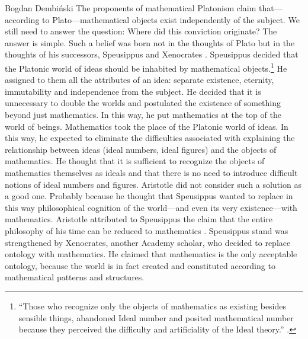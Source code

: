 \begin{artengenv}{Bogdan Dembiński}
The proponents of mathematical Platonism claim that---according to Plato---mathematical %
objects exist independently of the subject. We still need to answer the question: Where did this conviction  %
originate? %
 The answer is simple. Such a belief was born not in the thoughts of Plato but in the thoughts of his successors,
Speusippus and Xenocrates
\parencite[see][]{dembinski_pozny_2010,dillon_heirs_2003}.
Speusippus decided that the Platonic world of ideas should be inhabited by mathematical
objects.\footnote{``Those who recognize
only the objects of mathematics as existing besides sensible things, abandoned Ideal number and posited mathematical
number because they perceived the difficulty and artificiality of the Ideal theory.''
\parencite[\textit{Methaphysics}, 1086a]{aristotle_aristotles_1924}.
} He assigned to
them all the attributes of an idea: separate existence, eternity, immutability and independence from the subject. He
decided that it is unnecessary to double the worlds and postulated the existence of something beyond just mathematics.
In this way, he put mathematics at the top of the %
world of beings. Mathematics took the place of the Platonic world of ideas. In this way, he expected to eliminate the
difficulties associated with explaining the relationship between ideas (ideal numbers, ideal figures) and the objects
of mathematics. He thought that it is sufficient to recognize the objects of mathematics themselves as ideals and that
there is no need to introduce difficult notions of ideal numbers and figures. Aristotle did not consider such a
solution as a good one. Probably because he thought that Speusippus wanted to replace in this way philosophical
cognition of the world---and even its very existence---with mathematics. Aristotle attributed to Speusippus the
claim that the entire philosophy of his time can be reduced to mathematics
\parencite[\textit{Methaphysics}, 992a30]{aristotle_aristotles_1924}.
Speusippus stand was strengthened by Xenocrates, another Academy scholar, who decided to replace
ontology with mathematics. He claimed that mathematics is the only acceptable ontology, because the world is in fact
created and constituted according to mathematical patterns and structures.


\end{artengenv}
